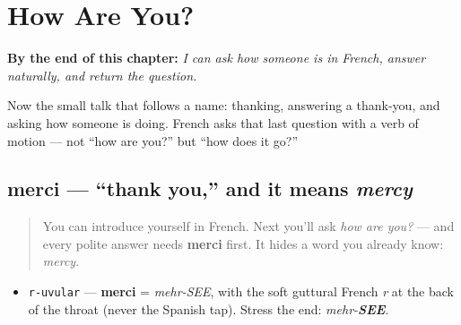 
\chapter{How Are You?}
\label{ch:how-are-you}

\begin{chapteropening}
\textbf{By the end of this chapter:} \emph{I can ask how someone is in French, answer naturally, and return the question.}

Now the small talk that follows a name: thanking, answering a thank-you, and asking how someone is doing. French asks that last question with a verb of motion — not “how are you?” but “how does it go?”
\end{chapteropening}

\section[merci]{merci — \textquotedblleft{}thank you,\textquotedblright{} and it means \emph{mercy}}

\label{lesson:FR-C03-merci}



\begin{quote}
You can introduce yourself in French. Next you'll ask \emph{how are you?} — and every polite answer needs \textbf{merci} first. It hides a word you already know: \emph{mercy}.
\end{quote}

\begin{sounds}
\begin{itemize}
\raggedright
  \item \texttt{r-uvular} — \textbf{merci} = \emph{mehr-SEE}, with the soft guttural French \emph{r} at the back of the throat (never the Spanish tap). Stress the end: \emph{mehr-\textbf{SEE}}.
\end{itemize}
\end{sounds}

